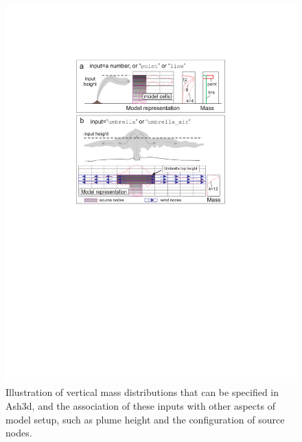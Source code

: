 \begin{figure}[htbp]\vspace*{-5cm}\hspace*{-2cm}
\includegraphics[angle=0,scale=0.8]{Figures/Scripts/VertMassDist.pdf}
\parbox{15cm}{\caption{\label{FigVertMassDistFormat}
Illustration of vertical mass distributions that can be specified in Ash3d, and the association of these inputs with other aspects of model setup, such as plume height and the configuration of source nodes.
}}
\end{figure}

